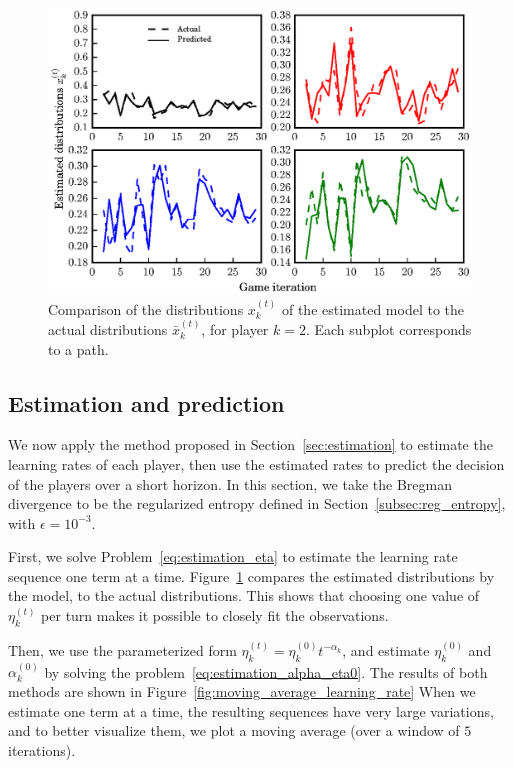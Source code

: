 \documentclass{sig-alternate-ipsn13}
\begin{document}
%


\begin{figure}[h!]
\centering
\includegraphics[width=.47\textwidth]{images/estimated_distribution.eps}
\caption{Comparison of the distributions $x^{(t)}_k$ of the estimated model to the actual distributions $\bar x^{(t)}_k$, for player $k = 2$. Each subplot corresponds to a path.}
\label{fig:estimated_distributions}
\end{figure}
\subsection{Estimation and prediction}
We now apply the method proposed in Section~\ref{sec:estimation} to estimate the learning rates of each player, then use the estimated rates to predict the decision of the players over a short horizon. In this section, we take the Bregman divergence to be the regularized entropy defined in Section~\ref{subsec:reg_entropy}, with $\epsilon = 10^{-3}$.

First, we solve Problem~\eqref{eq:estimation_eta} to estimate the learning rate sequence one term at a time. Figure~\ref{fig:estimated_distributions} compares the estimated distributions by the model, to the actual distributions. This shows that choosing one value of $\eta^{(t)}_k$ per turn makes it possible to closely fit the observations.

Then, we use the parameterized form $\eta^{(t)}_k = \eta_k^{(0)} t^{-\alpha_k}$, and estimate $\eta_k^{(0)}$ and $\alpha_k^{(0)}$ by solving the problem~\ref{eq:estimation_alpha_eta0}. The results of both methods are shown in Figure~\eqref{fig:moving_average_learning_rate}
When we estimate one term at a time, the resulting sequences have very large variations, and to better visualize them, we plot a moving average (over a window of $5$ iterations).
\end{document}
